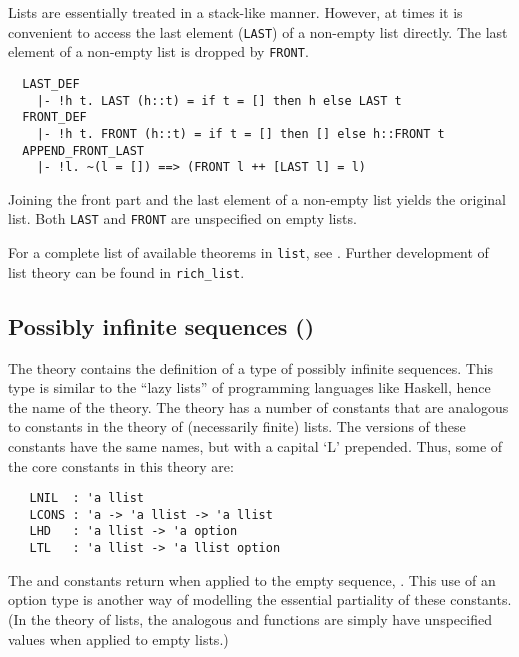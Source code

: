 Lists are essentially treated in a stack-like manner. However, at
times it is convenient to access the last element
({\small\verb+LAST+}) of a non-empty list directly. The last element
of a non-empty list is dropped by {\small\verb+FRONT+}.
%
{\small
\begin{verbatim}
  LAST_DEF
    |- !h t. LAST (h::t) = if t = [] then h else LAST t
  FRONT_DEF
    |- !h t. FRONT (h::t) = if t = [] then [] else h::FRONT t
  APPEND_FRONT_LAST
    |- !l. ~(l = []) ==> (FRONT l ++ [LAST l] = l)
\end{verbatim}}
%
Joining the front part and the last element of a non-empty list yields
the original list.  Both {\small\verb+LAST+} and {\small\verb+FRONT+}
are unspecified on empty lists.


\noindent For a complete list of available theorems in
{\small\verb+list+}, see \REFERENCE.  Further development of list
theory can be found in {\small\verb+rich_list+}.


\subsection{Possibly infinite sequences ()}

The theory  contains the definition of a type of
possibly infinite sequences.  This type is similar to the ``lazy
lists'' of programming languages like Haskell, hence the name of the
theory.  The  theory has a number of constants that
are analogous to constants in the theory of (necessarily finite)
lists.  The  versions of these constants have the
same names, but with a capital `L\/' prepended.  Thus, some of the core
constants in this theory are:

{\small \begin{verbatim}
   LNIL  : 'a llist
   LCONS : 'a -> 'a llist -> 'a llist
   LHD   : 'a llist -> 'a option
   LTL   : 'a llist -> 'a llist option
\end{verbatim}}

The  and  constants return  when applied to
the empty sequence, .  This use of an option type is another
way of modelling the essential partiality of these constants.  (In the
theory of lists, the analogous  and  functions are
simply have unspecified values when applied to empty lists.)

